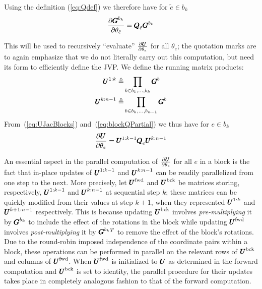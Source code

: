 \documentclass[superscriptaddress,floatfix]{article}
\begin{document}
Using the definition (\ref{eq:Qdef}) we therefore have for $\tilde{e}
\in b_k$
\begin{align}
\frac{\partial {\pmb{G}}^{b_k}}{\partial\theta_{\tilde{e}}} =
  {\pmb{Q}}_{\tilde{e}}{\pmb{G}}^{b_k}
  \label{eq:blockQPartial}
\end{align}

This will be used to recursively ``evaluate''
$\frac{\partial {\pmb{U}}}{\partial\theta_e}$ for all $\theta_e$; the
quotation marks are to again emphasize that we do not literally carry
out this computation, but need its form to efficiently define the JVP.
We define the running matrix products:
\begin{align}
  {\pmb{U}}^{1:k} \triangleq & \prod_{b \in b_1,\ldots,b_k}{\pmb{G}}^b \nonumber \\
  {\pmb{U}}^{k:n-1} \triangleq & \prod_{b \in b_k,\ldots,b_{n-1}}{\pmb{G}}^b
\end{align}
From~(\ref{eq:UJacBlocks}) and~(\ref{eq:blockQPartial}) we thus have
for $e \in b_k$
\[
\frac{\partial{\pmb{U}}}{\partial\theta_e} = {\pmb{U}}^{1:k-1} {\pmb{Q}}_e {\pmb{U}}^{k:n-1} 
\]

An essential aspect in the parallel computation of
$\frac{\partial{\pmb{U}}}{\partial\theta_e}$ for all $e$ in a block is the
fact that in-place updates of ${\pmb{U}}^{1:k-1}$ and ${\pmb{U}}^{k:n-1}$ can be
readily parallelized from one step to the next. More precisely, let
${\pmb{U}}^{\textrm{fwd}}$ and ${\pmb{U}}^{\textrm{bck}}$ be matrices storing, respectively,
${\pmb{U}}^{1:k-1}$ and ${\pmb{U}}^{k:n-1}$ at sequential step $k$; these matrices
can be quickly modified from their values at step $k+1$, when they
represented ${\pmb{U}}^{1:k}$ and ${\pmb{U}}^{k+1:n-1}$ respectively. This is
because updating ${\pmb{U}}^{\textrm{bck}}$ involves \emph{pre-multiplying} it by
${\pmb{G}}^{b_k}$ to include the effect of the rotations in the block while
updating ${\pmb{U}}^{\textrm{fwd}}$ involves \emph{post-multiplying} it by
${\pmb{G}}^{b_k}{}^T$ to remove the effect of the block's rotations. Due to
the round-robin imposed independence of the coordinate pairs within a
block, these operations can be performed in parallel on the relevant
rows of ${\pmb{U}}^{\textrm{bck}}$ and columns of ${\pmb{U}}^{\textrm{fwd}}$. When ${\pmb{U}}^{\textrm{fwd}}$ is
initialized to ${\pmb{U}}$ as determined in the forward computation and
${\pmb{U}}^{\textrm{bck}}$ is set to identity, the parallel procedure for their
updates takes place in completely analogous fashion to that of the
forward computation.
\end{document}
